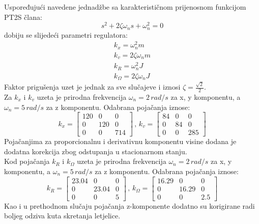 \documentclass[times, utf8, diplomski, numeric]{fer}
\begin{document}
	\noindent Uspoređujući navedene jednadžbe sa karakterističnom prijenosnom funkcijom PT2S člana: 
	\begin{equation}
		s^2 + 2 \zeta \omega_n s + \omega_n^2 = 0
	\end{equation}
	dobiju se slijedeći parametri regulatora:
	\begin{gather}
		k_x = \omega_n^2 m \\
		k_v = 2 \zeta \omega_n m \\
		k_R = \omega_n^2 J \\
		k_\Omega = 2 \zeta \omega_n J
	\end{gather}
	Faktor prigušenja uzet je jednak za sve slučajeve i iznosi $\zeta = \frac{\sqrt{2}}{2}$. \\
	Za $k_x$ i $k_v$ uzeta je prirodna frekvencija $\omega_n = 2 \, rad / s$ za x, y komponentu, a $\omega_n = 5 \, rad / s$ za z komponentu. Odabrana pojačanja iznose:
	\begin{equation}
		k_x = 
		\begin{bmatrix}
			120 & 0 & 0 \\
			0 & 120 & 0 \\
			0 & 0 &  714 
		\end{bmatrix}
		\, , \, 
		k_v = 
		\begin{bmatrix}
			84 & 0 & 0 \\
			0 & 84 & 0 \\
			0 & 0 & 285
		\end{bmatrix}
	\end{equation}
	Pojačanjima za proporcionalnu i derivativnu komponentu visine dodana je dodatna korekcija zbog odstupanja u stacionarnom stanju.\\
	Kod pojačanja $k_R$ i $k_\Omega$ uzeta je prirodna frekvencija $\omega_n = 2 \, rad/s$ za x, y komponentu, a $\omega_n = 5 \, rad/s$ za z komponentu. Odabrana pojačanja iznose:
	\begin{equation}
		k_R = 
		\begin{bmatrix}
			23.04 & 0 & 0 \\
			0 & 23.04 & 0 \\
			0 & 0 & 5
		\end{bmatrix}
		\, , \,
		k_\Omega = 
		\begin{bmatrix}
			16.29 & 0 & 0 \\
			0 & 16.29 & 0 \\
			0 & 0 & 2.5
		\end{bmatrix}
	\end{equation}
	Kao i u prethodnom slučaju pojačanja z-komponente dodatno su korigirane radi boljeg odziva kuta skretanja letjelice.
	
\end{document}

